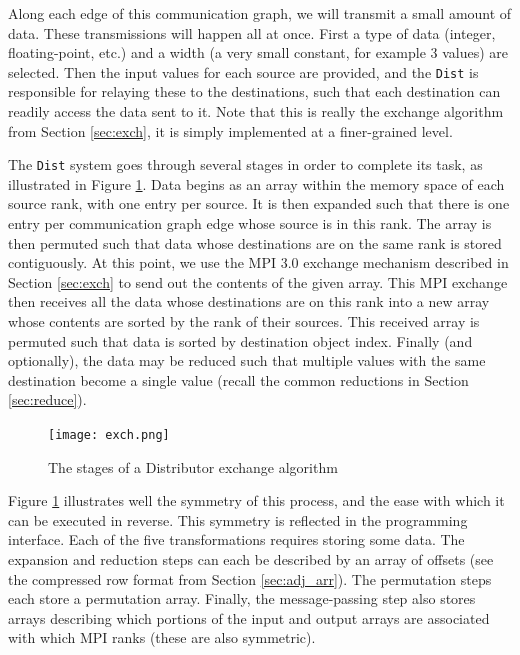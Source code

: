 Along each edge of this communication graph, we will transmit
a small amount of data.
These transmissions will happen all at once.
First a type of data (integer, floating-point, etc.) and a width
(a very small constant, for example 3 values) are selected.
Then the input values for each source are provided, and the
\texttt{Dist} is responsible for relaying these to
the destinations, such that each destination can readily access
the data sent to it.
Note that this is really the exchange algorithm from
Section \ref{sec:exch}, it is simply implemented at a finer-grained level.

The \texttt{Dist} system goes through several stages in order
to complete its task, as illustrated in Figure \ref{fig:exch}.
Data begins as an array within the memory space of each source rank,
with one entry per source.
It is then expanded such that there is one entry per communication graph
edge whose source is in this rank.
The array is then permuted such that data whose destinations are on
the same rank is stored contiguously.
At this point, we use the MPI 3.0 exchange mechanism described in
Section \ref{sec:exch} to send out the contents of the given
array.
This MPI exchange then receives all the data whose destinations are on this rank
into a new array whose contents are sorted by the rank of their sources.
This received array is permuted such that data is sorted
by destination object index.
Finally (and optionally), the data may be reduced such that
multiple values with the same destination become a single
value (recall the common reductions in Section \ref{sec:reduce}).

\begin{figure}[t]\vspace*{4pt}
\centerline{\texttt{[image: exch.png]}}
\caption{The stages of a Distributor exchange algorithm}\vspace*{-6pt}
\label{fig:exch}
\end{figure}

Figure \ref{fig:exch} illustrates well the symmetry of this process,
and the ease with which it can be executed in reverse.
This symmetry is reflected in the programming interface.
Each of the five transformations requires storing some data.
The expansion and reduction steps can each be described by an array
of offsets (see the compressed row format from Section \ref{sec:adj_arr}).
The permutation steps each store a permutation array.
Finally, the message-passing step also stores arrays describing which
portions of the input and output arrays are associated with which
MPI ranks (these are also symmetric).

